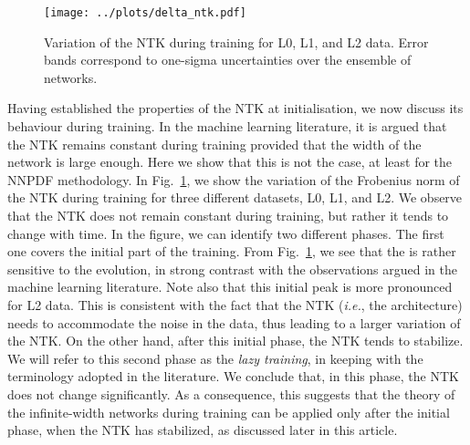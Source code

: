 \begin{figure}[h!]
  \centering
  \texttt{[image: ../plots/delta\_ntk.pdf]}
  \caption{Variation of the NTK during training for L0, L1, and L2 data. Error
  bands correspond to one-sigma uncertainties over the ensemble of networks.}
  \label{fig:NTKTime}
\end{figure}
Having established the properties of the NTK at initialisation, we now discuss
its behaviour during training. In the machine learning literature, it is argued
that the NTK remains constant during training provided that the width of the
network is large enough. Here we show that this is not the case, at least for
the NNPDF methodology. In Fig.~\ref{fig:NTKTime}, we show the variation of the
Frobenius norm of the NTK during training for three different datasets, L0, L1,
and L2. We observe that the NTK does not remain constant during training, but
rather it tends to change with time. In the figure, we can identify two
different phases. The first one covers the initial part of the training. From
Fig.~\ref{fig:NTKTime}, we see that the is rather sensitive to the evolution, in
strong contrast with the observations argued in the machine learning literature.
Note also that this initial peak is more pronounced for L2 data. This is
consistent with the fact that the NTK (\textit{i.e.}, the architecture) needs to
accommodate the noise in the data, thus leading to a larger variation of the
NTK. On the other hand, after this initial phase, the NTK tends to stabilize. We
will refer to this second phase as the \textit{lazy training}, in keeping with
the terminology adopted in the literature. We conclude that, in this phase, the
NTK does not change significantly. As a consequence, this suggests that the
theory of the infinite-width networks during training can be applied only after
the initial phase, when the NTK has stabilized, as discussed later in this
article.


